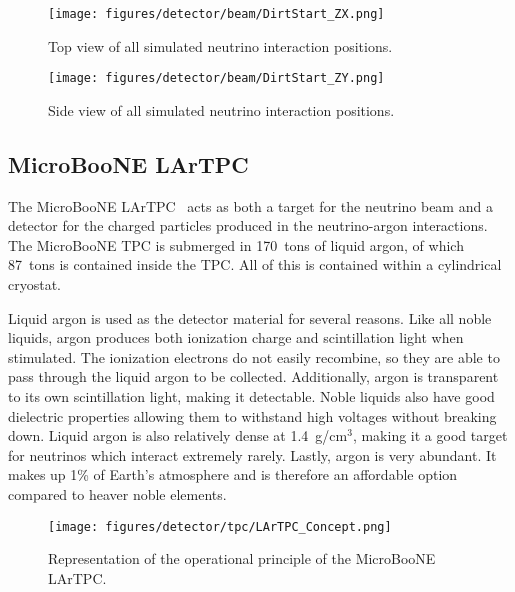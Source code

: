   \begin{figure}[h]
    \texttt{[image: figures/detector/beam/DirtStart\_ZX.png]}
    \caption{Top view of all simulated neutrino interaction positions.}
    \label{fig:dirtstarttop}
  \end{figure}
  \begin{figure}[h]
    \texttt{[image: figures/detector/beam/DirtStart\_ZY.png]}
    \caption{Side view of all simulated neutrino interaction positions.}
    \label{fig:dirtstartside}
  \end{figure}

\subsection{MicroBooNE LArTPC}\label{sec:lartpc}
  The MicroBooNE LArTPC~\cite{Acciarri:2016smi} acts as both a target for the neutrino
  beam and a detector for the charged particles produced in the neutrino-argon
  interactions. The MicroBooNE TPC is submerged in 170~tons of liquid argon, of
  which 87~tons is contained inside the TPC. All of this is contained within a
  cylindrical cryostat.
  
  Liquid argon is used as the detector material for several reasons. Like all
  noble liquids, argon produces both ionization charge and scintillation light
  when stimulated.  The ionization electrons do not easily recombine, so they
  are able to pass through the liquid argon to be collected.  Additionally,
  argon is transparent to its own scintillation light, making it detectable.
  Noble liquids also have good dielectric properties allowing them to withstand
  high voltages without breaking down. Liquid argon is also relatively dense at
  1.4~g/cm$^3$, making it a good target for neutrinos which interact extremely
  rarely. Lastly, argon is very abundant.  It makes up 1\% of Earth's
  atmosphere and is therefore an affordable option compared to heaver noble
  elements.

  \begin{figure}[h]
    \centering
    \texttt{[image: figures/detector/tpc/LArTPC\_Concept.png]}
    \caption{Representation of the operational principle of the MicroBooNE
    LArTPC.}
    \label{fig:tpccartoon}
  \end{figure}

